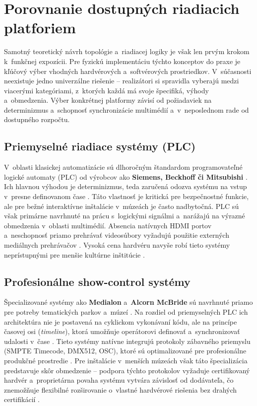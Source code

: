 \section{Porovnanie dostupných riadiacich platforiem}
\label{existujuce-pristupy}

Samotný teoretický návrh topológie a~riadiacej
logiky je však len prvým krokom k~funkčnej expozícii. Pre fyzickú
implementáciu týchto konceptov do praxe je kľúčový výber
vhodných hardvérových a~softvérových prostriedkov. V~súčasnosti
neexistuje jedno univerzálne riešenie -- realizátori si spravidla
vyberajú medzi viacerými kategóriami, z~ktorých každá má svoje
špecifiká, výhody a~obmedzenia. Výber konkrétnej platformy
závisí od požiadaviek na determinizmus a~schopnosť synchronizácie
multimédií a~v~neposlednom rade od dostupného rozpočtu.

\subsection{Priemyselné riadiace systémy (PLC)}
\label{plc-systemy}

V~oblasti klasickej automatizácie sú dlhoročným štandardom
programovateľné logické automaty (PLC) od výrobcov ako
\textbf{Siemens, Beckhoff či Mitsubishi} \cite{iec61131, john2010plc}.
Ich hlavnou výhodou je determinizmus, teda zaručená odozva systému
na vstup v~presne definovanom čase \cite{iec61131, john2010plc}. Táto
vlastnosť je kritická pre bezpečnostné funkcie, ale pre bežné
interaktívne inštalácie v~múzeách je často nadbytočná. PLC sú
však primárne navrhnuté na prácu s~logickými signálmi a~narážajú
na výrazné obmedzenia v~oblasti multimédií. Absencia natívnych
HDMI portov a~neschopnosť priamo prehrávať videosúbory vyžadujú
použitie externých mediálnych prehrávačov \cite{huntington2017}.
Vysoká cena hardvéru navyše robí tieto systémy
neprístupnými pre menšie kultúrne inštitúcie
\cite{interactive_small_museums}.

\subsection{Profesionálne show-control systémy}
\label{show-control}

Špecializované systémy ako \textbf{Medialon} a~\textbf{Alcorn
McBride} sú navrhnuté priamo pre potreby tematických parkov
a~múzeí \cite{medialon_7thsense, alcornmcbride, alcornmcbride_history}. Na rozdiel od
priemyselných PLC ich architektúra nie je postavená na cyklickom
vykonávaní kódu, ale na princípe časovej osi (\textit{timeline}),
ktorá umožňuje operátorovi definovať a~synchronizovať
udalosti v~čase \cite{medialon_7thsense, huntington2017}.
Tieto systémy natívne integrujú protokoly zábavného priemyslu
(SMPTE Timecode, DMX512, OSC), ktoré sú optimalizované pre
profesionálne produkčné prostredie \cite{huntington2017}. Pre
inštalácie v~menších múzeách však táto špecializácia predstavuje
skôr obmedzenie -- podpora týchto protokolov vyžaduje certifikovaný
hardvér a~proprietárna povaha systému vytvára závislosť od
dodávateľa, čo znemožňuje flexibilné rozširovanie o~vlastné
hardvérové riešenia bez drahých certifikácií \cite{huntington2017}.

